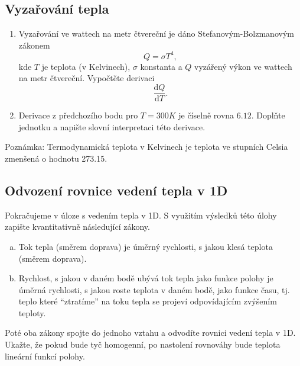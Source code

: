     \subsection{Vyzařování tepla}

    \begin{enumerate}
    \item Vyzařování ve wattech na metr čtvereční je dáno Stefanovým-Bolzmanovým zákonem
      $$Q=\sigma T^4,$$
      kde $T$ je teplota (v Kelvinech), $\sigma$ konstanta a $Q$ vyzářený výkon ve wattech na metr čtvereční. Vypočtěte derivaci
      $$\frac{\mathrm dQ}{\mathrm dT}.$$
    \item Derivace z předchozího bodu pro $T=300K$ je číselně rovna $6.12$. Doplňte jednotku a napište slovní interpretaci této derivace.
    \end{enumerate}
    Poznámka: Termodynamická teplota v Kelvinech je teplota ve stupních Celsia zmenšená o hodnotu 273.15.


\subsection{Odvození rovnice vedení tepla v 1D}

Pokračujeme v úloze s vedením tepla v 1D. S využitím výsledků této úlohy zapište kvantitativně následující zákony.
\begin{enumerate}[a)]
\item Tok tepla (směrem doprava) je úměrný rychlosti, s jakou klesá
teplota (směrem doprava).
\item Rychlost, s jakou v daném bodě ubývá tok tepla jako funkce polohy je úměrná rychlosti, s jakou roste teplota v daném bodě, jako funkce času, tj. teplo které ``ztratíme'' na toku tepla se projeví odpovídajícím zvýšením teploty. 
\end{enumerate}

Poté oba zákony spojte do jednoho vztahu a odvodíte rovnici vedení tepla v 1D.
Ukažte, že pokud bude tyč homogenní, po nastolení rovnováhy bude teplota lineární funkcí polohy.

\reseni

